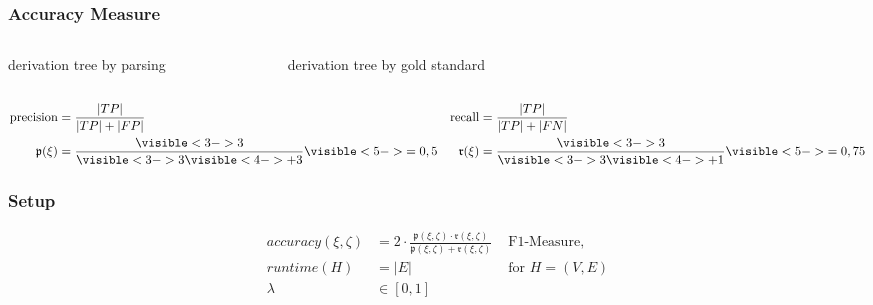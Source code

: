 \documentclass[ddcfooter, noheader, nototalpages, nosectionnum, svgnames]{tudbeamer}
\begin{document}
\begin{frame}
	\frametitle{Accuracy Measure}
	\begin{overlayarea}{\textwidth}{0.5\textheight}
		\only<1>
		{
			\begin{figure}
				\scalebox{0.6}{}
			\end{figure}
		}
		{
			\begin{columns}
				derivation tree by parsing
				\begin{figure}
				\end{figure}
				derivation tree by gold standard
				\begin{figure}
				\end{figure}
			\end{columns}
		}
	\end{overlayarea}
	\begin{align*}
		\text{precision} &= \frac{|TP|}{|TP|+|FP|}
		&\text{recall} &= \frac{|TP|}{|TP|+|FN|}\\
		\mathfrak{p}(\xi) &=
		\frac{\visible<3->{3}}
			{\visible<3->{3}\visible<4->{+ 3}}
		\visible<5->{=0,5}
		&\mathfrak{r}(\xi) &=
		\frac{\visible<3->{3}}
			{\visible<3->{3}\visible<4->{+ 1}}
		\visible<5->{= 0,75}
	\end{align*}
\end{frame}

\begin{frame}
	\frametitle{Setup}
	\begin{align*}
		accuracy(\xi, \zeta) &= 2 \cdot
			\frac{\mathfrak{p}(\xi, \zeta) \cdot \mathfrak{r}(\xi, \zeta)}
			{\mathfrak{p}(\xi, \zeta) + \mathfrak{r}(\xi, \zeta)}
		& \text{ F1-Measure},\\
		runtime(H) &= |E|
		& \text{ for } H = (V, E)\\
		\lambda &\in [0, 1]
	\end{align*}
\end{frame}
\end{document}
